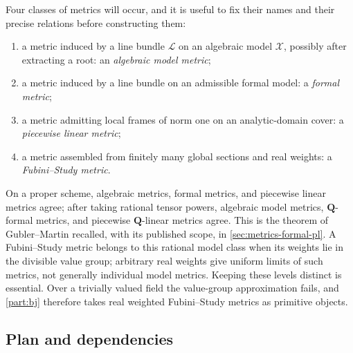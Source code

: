 Four classes of metrics will occur, and it is useful to fix their names and
their precise relations before constructing them:
\begin{enumerate}
\item a metric induced by a line bundle $\mathcal L$ on an algebraic model
$\mathcal X$, possibly after extracting a root: an \emph{algebraic model
metric};
\item a metric induced by a line bundle on an admissible formal model: a
\emph{formal metric};
\item a metric admitting local frames of norm one on an analytic-domain
cover: a \emph{piecewise linear metric};
\item a metric assembled from finitely many global sections and real
weights: a \emph{Fubini--Study metric}.
\end{enumerate}
On a proper scheme, algebraic metrics, formal metrics, and piecewise linear
metrics agree; after taking rational tensor powers, algebraic model metrics,
$\mathbf Q$-formal metrics, and piecewise $\mathbf Q$-linear metrics agree.
This is the theorem of Gubler--Martin recalled, with its published scope, in
\cref{sec:metrics-formal-pl}. A Fubini--Study metric belongs to this rational
model class when its weights lie in the divisible value group; arbitrary real
weights give uniform limits of such metrics, not generally individual model
metrics. Keeping these levels distinct is essential. Over a trivially valued
field the value-group approximation fails, and \cref{part:bj} therefore takes
real weighted Fubini--Study metrics as primitive objects.

\subsection*{Plan and dependencies}

